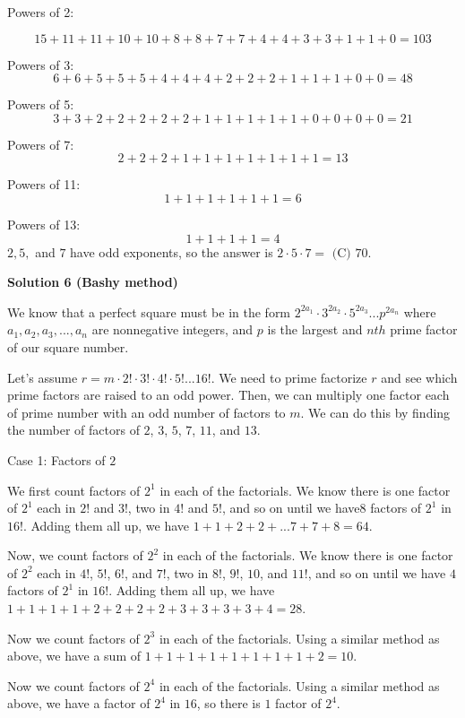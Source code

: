 \begin{enumerate}
 Powers of 2: 

 
 \[15 + 11 + 11 + 10 + 10 + 8 +8 + 7 + 7 + 4 + 4 + 3 + 3 + 1 + 1 + 0 = 103\] 

 Powers of 3:
 \[6 + 6 + 5 + 5 + 5 + 4 + 4 + 4 + 2 + 2 + 2 + 1 + 1 + 1 + 0 + 0 = 48\] 

 Powers of 5:
 \[3 + 3 + 2 + 2 + 2 + 2 + 2 + 1 + 1 + 1 + 1 + 1 + 0 + 0 + 0 + 0 = 21\] 

 Powers of 7:
 \[2 + 2 + 2 + 1 + 1 + 1 + 1 + 1 + 1 + 1 = 13\] 

 Powers of 11:
 \[1 + 1 + 1 + 1 + 1 + 1 = 6\] 

 Powers of 13:
 \[1 + 1 + 1 + 1 = 4\]
$2, 5,$ and $7$ have odd exponents, so the answer is $2\cdot 5 \cdot 7 = \boxed{\text{ (C) }70}$.

 



\textbf{Solution 6 (Bashy method)}

We know that a perfect square must be in the form $2^{2a_1}\cdot3^{2a_2}\cdot5^{2a_3}...p^{2a_n}$ where $a_1, a_2, a_3, ..., a_n$ are nonnegative integers, and $p$ is the largest and $nth$ prime factor of our square number.

 Let's assume $r=m\cdot2!\cdot3!\cdot4!\cdot5!...16!$. We need to prime factorize $r$ and see which prime factors are raised to an odd power. Then, we can multiply one factor each of prime number with an odd number of factors to $m$. We can do this by finding the number of factors of $2$, $3$, $5$, $7$, $11$, and $13$.

 Case 1: Factors of $2$

 We first count factors of $2^1$ in each of the factorials. We know there is one factor of $2^1$ each in $2!$ and $3!$, two in $4!$ and $5!$, and so on until we have$8$ factors of $2^1$ in $16!$. Adding them all up, we have $1+1+2+2+...7+7+8=64$.

 Now, we count factors of $2^2$ in each of the factorials. We know there is one factor of $2^2$ each in $4!$, $5!$, $6!$, and $7!$, two in $8!$, $9!$, $10$, and $11!$, and so on until we have $4$ factors of $2^1$ in $16!$. Adding them all up, we have $1+1+1+1+2+2+2+2+3+3+3+3+4=28$.

 Now we count factors of $2^3$ in each of the factorials. Using a similar method as above, we have a sum of $1+1+1+1+1+1+1+1+2=10$.

 Now we count factors of $2^4$ in each of the factorials. Using a similar method as above, we have a factor of $2^4$ in $16$, so there is $1$ factor of $2^4$.


\end{enumerate}
